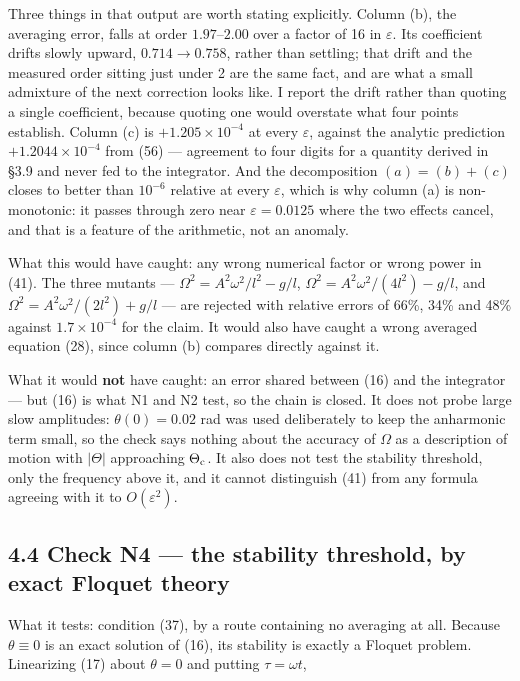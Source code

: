 \documentclass[11pt,a4paper]{article}
\newcommand{\tagmark}[1]{\marginnote{\scriptsize\ttfamily #1}}
\newcommand{\Ntag}{\tagmark{[N]}}   %
\begin{document}
Three things in that output are worth stating explicitly. Column (b), the
averaging error, falls at order \(1.97\)--\(2.00\) over a factor of 16 in
\(\varepsilon\). Its coefficient drifts slowly upward, \(0.714\to0.758\), rather
than settling; that drift and the measured order sitting just under 2 are the
same fact, and are what a small admixture of the next correction looks like. I
report the drift rather than quoting a single coefficient, because quoting one
would overstate what four points establish. Column (c) is
\(+1.205\times10^{-4}\) at every \(\varepsilon\), against the analytic prediction
\(+1.2044\times10^{-4}\) from (56) --- agreement to four digits for a quantity
derived in §3.9 and never fed to the integrator. And the
decomposition \((a)=(b)+(c)\) closes to better than \(10^{-6}\) relative at every
\(\varepsilon\), which is why column (a) is non-monotonic: it passes through zero
near \(\varepsilon=0.0125\) where the two effects cancel, and that is a feature of
the arithmetic, not an anomaly.

What this would have caught: any wrong numerical factor or wrong power in (41).
The three mutants --- \(\Omega^2=A^2\omega^2/l^2-g/l\),
\(\Omega^2=A^2\omega^2/(4l^2)-g/l\), and \(\Omega^2=A^2\omega^2/(2l^2)+g/l\) --- are
rejected with relative errors of 66\%, 34\% and 48\% against
\(1.7\times10^{-4}\) for the claim. It would also have caught a wrong averaged
equation (28), since column (b) compares directly against it.

What it would \textbf{not} have caught: an error shared between (16) and the
integrator --- but (16) is what N1 and N2 test, so the chain is closed. It does
not probe large slow amplitudes: \(\theta(0)=0.02\) rad was used deliberately to
keep the anharmonic term small, so the check says nothing about the accuracy of
\(\Omega\) as a description of motion with \(|\Theta|\) approaching
\(\Theta_{\rm c}\). It also does not test the stability threshold, only the
frequency above it, and it cannot distinguish (41) from any formula agreeing
with it to \(O(\varepsilon^2)\).

\hypertarget{check-n4-the-stability-threshold-by-exact-floquet-theory}{%
\subsection{4.4 Check N4 --- the stability threshold, by exact Floquet theory}\label{check-n4-the-stability-threshold-by-exact-floquet-theory}}

\Ntag{} What it tests: condition (37), by a route containing no averaging at all.
Because \(\theta\equiv0\) is an exact solution of (16), its stability is exactly a
Floquet problem. Linearizing (17) about \(\theta=0\) and putting \(\tau=\omega t\),
\end{document}
